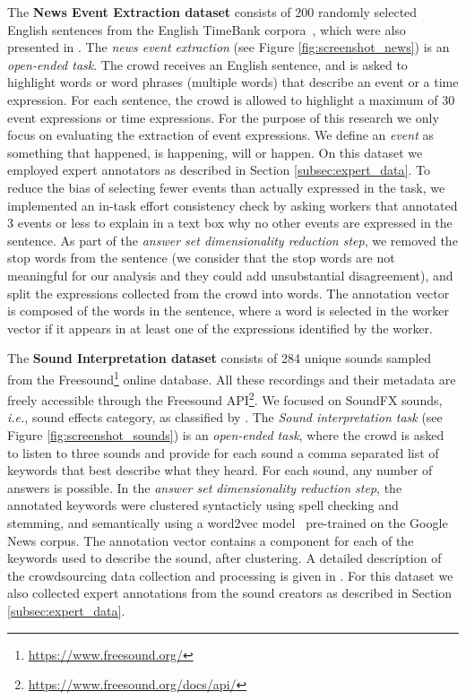 The \textbf{News Event Extraction dataset} consists of 200 randomly selected English sentences from the English TimeBank corpora~\cite{pustejovsky2003timebank}, which were also presented in \cite{CASELLI16.966}. The \emph{news event extraction} (see Figure \ref{fig:screenshot_news}) is an \textit{open-ended task}. The crowd receives an English sentence, and is asked to highlight words or word phrases (multiple words) that describe an event or a time expression. For each sentence, the crowd is allowed to highlight a maximum of 30 event expressions or time expressions. For the purpose of this research we only focus on evaluating the extraction of event expressions. We define an \emph{event} as something that happened, is happening, will or happen. On this dataset we employed expert annotators as described in Section \ref{subsec:expert_data}. To reduce the bias of selecting fewer events than actually expressed in the task, we implemented an in-task effort consistency check by asking workers that annotated 3 events or less to explain in a text box why no other events are expressed in the sentence. As part of the \textit{answer set dimensionality reduction step}, we removed the stop words from the sentence (we consider that the stop words are not meaningful for our analysis and they could add unsubstantial disagreement), and split the expressions collected from the crowd into words.  The annotation vector is composed of the words in the sentence, where a word is selected in the worker vector if it appears in at least one of the expressions identified by the worker.

The \textbf{Sound Interpretation dataset} consists of 284 unique sounds sampled from the Freesound\footnote{\url{https://www.freesound.org/}} online database. All these recordings and their metadata are freely accessible through the Freesound API\footnote{\url{https://www.freesound.org/docs/api/}}. We focused on SoundFX sounds, \emph{i.e.}, sound effects category, as classified by \cite{font2014audio}. The \emph{Sound interpretation task} (see Figure \ref{fig:screenshot_sounds}) is an \textit{open-ended task}, where the crowd is asked to listen to three sounds and provide for each sound a comma separated list of keywords that best describe what they heard. For each sound, any number of answers is possible. In the \textit{answer set dimensionality reduction step}, the annotated keywords were clustered syntacticly using spell checking and stemming, and semantically using a word2vec model~\cite{mikolov2013distributed} pre-trained on the Google News corpus.  The annotation vector contains a component for each of the keywords used to describe the sound, after clustering. A detailed description of the crowdsourcing data collection and processing is given in \cite{miltenburg2016}. For this dataset we also collected expert annotations from the sound creators as described in Section \ref{subsec:expert_data}.


